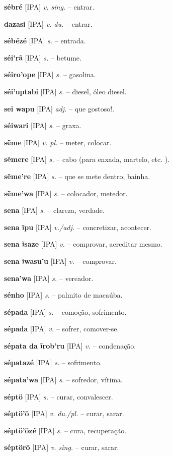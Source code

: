 {\textbf{sébré} [IPA] \textit{v. sing.} -- entrar.

\textbf{dazasi} [IPA] \textit{v. du.} -- entrar.

\textbf{sébézé} [IPA] \textit{s.} -- entrada.

\textbf{séi'rã} [IPA] \textit{s.} -- betume.

\textbf{séiro'ope} [IPA] \textit{s.} -- gasolina.

\textbf{séi'uptabi} [IPA] \textit{s.} -- diesel, óleo diesel.

\textbf{sei wapu} [IPA] \textit{adj.} -- que gostoso!.

\textbf{séiwari} [IPA] \textit{s.} -- graxa.

\textbf{sẽme} [IPA] \textit{v. pl.} -- meter, colocar.

\textbf{sẽmere} [IPA] \textit{s.} -- cabo (para enxada, martelo, etc. ).

\textbf{sẽme're} [IPA] \textit{s.} -- que se mete dentro, bainha.

\textbf{sẽme'wa} [IPA] \textit{s.} -- colocador, metedor.

\textbf{sena} [IPA] \textit{s.} -- clareza, verdade.

\textbf{sena ĩpu} [IPA] \textit{v./adj.} -- concretizar, acontecer.

\textbf{sena ĩsaze} [IPA] \textit{v.} -- comprovar, acreditar mesmo.

\textbf{sena ĩwasu'u} [IPA] \textit{v.} -- comprovar.

\textbf{sena'wa} [IPA] \textit{s.} -- vereador.

\textbf{sénho} [IPA] \textit{s.} -- palmito de macaúba.

\textbf{sépada} [IPA] \textit{s.} -- comoção, sofrimento.

\textbf{sépada} [IPA] \textit{v.} -- sofrer, comover-se.

\textbf{sépata da ĩrob'ru} [IPA] \textit{v.} -- condenação.

\textbf{sépatazé} [IPA] \textit{s.} -- sofrimento.

\textbf{sépata'wa} [IPA] \textit{s.} -- sofredor, vítima.

\textbf{séptö} [IPA] \textit{s.} -- curar, convalescer.

\textbf{séptö'ö} [IPA] \textit{v. du./pl.} -- curar, sarar.

\textbf{séptö'özé} [IPA] \textit{s.} -- cura, recuperação.

\textbf{séptörö} [IPA] \textit{v. sing.} -- curar, sarar.

}
